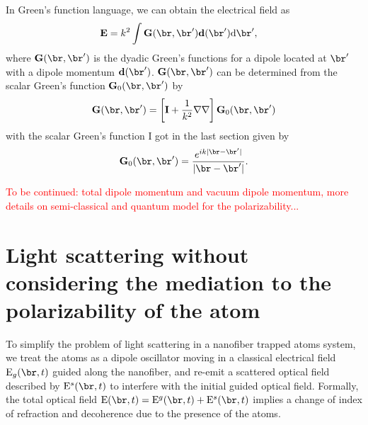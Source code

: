 \documentclass[]{report}
\begin{document}
In Green's function language, we can obtain the electrical field as
\begin{align}\label{EGd}
\mathbf{E} &= k^2 \int \mathbf{G}(\br,\br')\mathbf{d}(\br') \mathrm{d}\br', 
\end{align}
where $ \mathbf{G}(\br,\br') $ is the dyadic Green's functions for a dipole located at $ \br' $ with a dipole momentum $ \mathbf{d}(\br') $. $\mathbf{G}(\br,\br')$ can be determined from the scalar Green's function $\mathbf{G}_0(\br,\br')$ by 
\begin{align}
\mathbf{G}(\br,\br') = \left[\mathbf{I} + \frac{1}{k^2}\nabla\nabla \right]\mathbf{G}_0(\br,\br')
\end{align}
with the scalar Green's function I got in the last section given by
\begin{align}
\mathbf{G}_0(\br,\br') = \frac{e^{ik|\br-\br'|}}{|\br-\br'|}. 
\end{align}


\textcolor{red}{To be continued: total dipole momentum and vacuum dipole momentum, more details on semi-classical and quantum model for the polarizability...}







\section{Light scattering without considering the mediation to the polarizability of the atom}
To simplify the problem of light scattering in a nanofiber trapped atoms system, we treat the atoms as a dipole oscillator moving in a classical electrical field $ \mathrm{E}_{g}(\br,t) $ guided along the nanofiber, and re-emit a scattered optical field described by $ \mathrm{E}^s(\br,t) $ to interfere with the initial guided optical field. Formally, the total optical field $ \mathrm{E}(\br,t)= \mathrm{E}^g(\br,t)  + \mathrm{E}^s(\br,t) $ implies a change of index of refraction and decoherence due to the presence of the atoms. 
\end{document}

